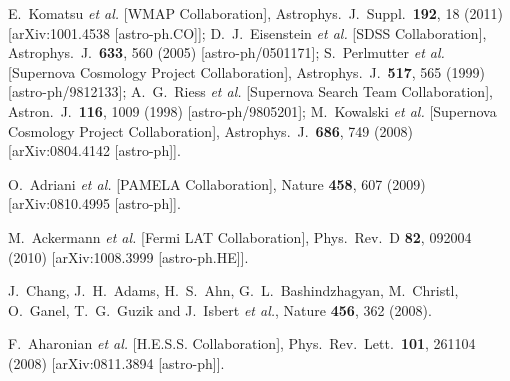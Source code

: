   E.~Komatsu {\it et al.}  [WMAP Collaboration],
  Astrophys.\ J.\ Suppl.\  {\bf 192}, 18 (2011)
  [arXiv:1001.4538 [astro-ph.CO]];
  D.~J.~Eisenstein {\it et al.}  [SDSS Collaboration],
  Astrophys.\ J.\  {\bf 633}, 560 (2005)
  [astro-ph/0501171];
  S.~Perlmutter {\it et al.}  [Supernova Cosmology Project Collaboration],
  Astrophys.\ J.\  {\bf 517}, 565 (1999)
  [astro-ph/9812133];
  A.~G.~Riess {\it et al.}  [Supernova Search Team Collaboration],
  Astron.\ J.\  {\bf 116}, 1009 (1998)
  [astro-ph/9805201];
  M.~Kowalski {\it et al.}  [Supernova Cosmology Project Collaboration],
  Astrophys.\ J.\  {\bf 686}, 749 (2008)
  [arXiv:0804.4142 [astro-ph]].

  O.~Adriani {\it et al.}  [PAMELA Collaboration],
  Nature {\bf 458}, 607 (2009)
  [arXiv:0810.4995 [astro-ph]].

  M.~Ackermann {\it et al.}  [Fermi LAT Collaboration],
  Phys.\ Rev.\ D {\bf 82}, 092004 (2010)
  [arXiv:1008.3999 [astro-ph.HE]].

  J.~Chang, J.~H.~Adams, H.~S.~Ahn, G.~L.~Bashindzhagyan, M.~Christl, O.~Ganel, T.~G.~Guzik and J.~Isbert {\it et al.},
  Nature {\bf 456}, 362 (2008).

  F.~Aharonian {\it et al.}  [H.E.S.S. Collaboration],
  Phys.\ Rev.\ Lett.\  {\bf 101}, 261104 (2008)
  [arXiv:0811.3894 [astro-ph]].

